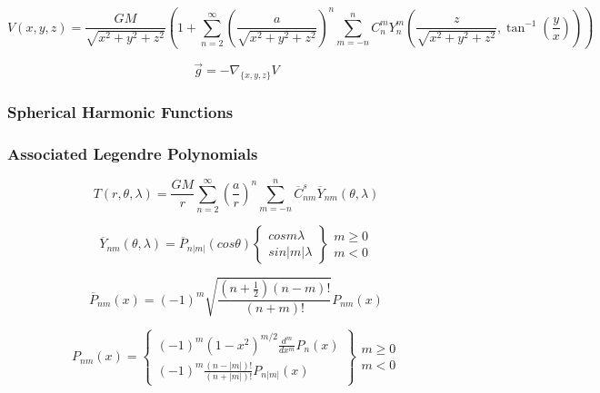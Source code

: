 \documentclass{article}
\begin{document}
\begin{equation}
V\left(x,y,z\right) = \frac{G M}{\sqrt{x^2+y^2+z^2}} \left(1 + \sum_{n=2}^{\infty} \left(\frac{a}{\sqrt{x^2+y^2+z^2}}\right)^n \sum_{m=-n}^n C_n^m Y_n^m\left(\frac{z}{\sqrt{x^2+y^2+z^2}},\tan^{-1}\left(\frac{y}{x}\right)\right)\right)
\end{equation}

\begin{equation}
\vec{g} = -\nabla_{\{x,y,z\}}V
\end{equation}

\subsubsection{Spherical Harmonic Functions}
\subsubsection{Associated Legendre Polynomials}
\begin{equation}
T{\left(r,\theta,\lambda\right)} = \frac{G M}{r} \sum_{n=2}^\infty \left(\frac{a}{r}\right)^n \sum_{m=-n}^n \overline{C}_{n m}^s \overline{Y}_{n m}{\left(\theta,\lambda\right)}
\end{equation}

\begin{equation}
\overline{Y}_{n m}{\left(\theta,\lambda\right)} = \overline{P}_{n |m|}{\left(cos \theta\right)} \left\{\begin{array}{l}
cos m \lambda \\
sin |m| \lambda
\end{array}\right\} \begin{array}{l}
m \geq 0 \\
m < 0
\end{array}
\end{equation}

\begin{equation}
\overline{P}_{n m}{\left(x\right)} = \left(-1\right)^m \sqrt{\frac{\left(n + \frac{1}{2}\right) \left(n - m\right)!}{\left(n + m\right)!}} P_{n m}{\left(x\right)}
\end{equation}

\begin{equation}
P_{n m}{\left(x\right)} = \left\{\begin{array}{l}
\left(-1\right)^m \left(1 - x^2\right)^{m / 2} \frac{d^m}{d x^m} P_n{\left(x\right)} \\
\left(-1\right)^m \frac{\left(n - |m|\right)!}{\left(n + |m|\right)!} P_{n |m|}{\left(x\right)}
\end{array}\right\} \begin{array}{l}
m \geq 0 \\
m < 0
\end{array}
\end{equation}
\end{document}
